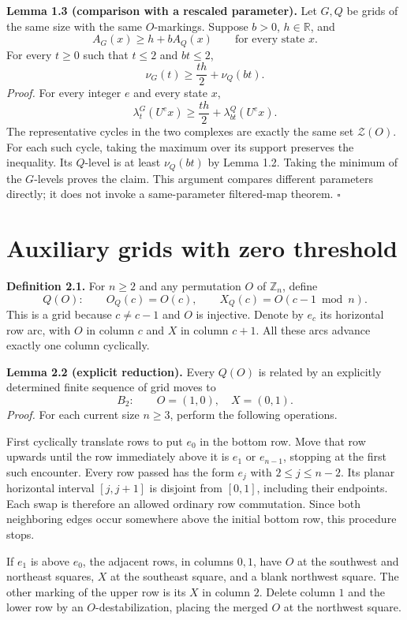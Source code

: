 \documentclass[11pt,a4paper]{article}
\begin{document}
\textbf{Lemma 1.3 (comparison with a rescaled parameter).}
Let $G,Q$ be grids of the same size with the same $O$-markings. Suppose
$b>0$, $h\in\mathbb R$, and
\[
A_G(x)\ge h+bA_Q(x)\qquad\text{for every state }x.
\]
For every $t\ge0$ such that $t\le2$ and $bt\le2$,
\[
\nu_G(t)\ge\frac{th}{2}+\nu_Q(bt).
\]
\textit{Proof.}
For every integer $e$ and every state $x$,
\[
\lambda_t^G(U^e x)\ge\frac{th}{2}+\lambda_{bt}^Q(U^e x).
\]
The representative cycles in the two complexes are exactly the same set
$\mathcal Z(O)$. For each such cycle, taking the maximum over its support
preserves the inequality. Its $Q$-level is at least $\nu_Q(bt)$ by Lemma 1.2.
Taking the minimum of the $G$-levels proves the claim. This argument compares
different parameters directly; it does not invoke a same-parameter
filtered-map theorem. $\square$

\section{Auxiliary grids with zero threshold}

\textbf{Definition 2.1.}
For $n\ge2$ and any permutation $O$ of $\mathbb Z_n$, define
\[
Q(O):\qquad O_Q(c)=O(c),\qquad X_Q(c)=O(c-1\bmod n).
\]
This is a grid because $c\ne c-1$ and $O$ is injective. Denote by $e_c$ its
horizontal row arc, with $O$ in column $c$ and $X$ in column $c+1$.
All these arcs advance exactly one column cyclically.

\textbf{Lemma 2.2 (explicit reduction).}
Every $Q(O)$ is related by an explicitly determined finite sequence of grid
moves to
\[
B_2:\qquad O=(1,0),\quad X=(0,1).
\]
\textit{Proof.}
For each current size $n\ge3$, perform the following operations.

First cyclically translate rows to put $e_0$ in the bottom row. Move that row
upwards until the row immediately above it is $e_1$ or $e_{n-1}$, stopping at
the first such encounter. Every row passed has the form $e_j$ with
$2\le j\le n-2$. Its planar horizontal interval $[j,j+1]$ is disjoint from
$[0,1]$, including their endpoints. Each swap is therefore an allowed
ordinary row commutation. Since both neighboring edges occur somewhere
above the initial bottom row, this procedure stops.

If $e_1$ is above $e_0$, the adjacent rows, in columns $0,1$, have $O$ at the
southwest and northeast squares, $X$ at the southeast square, and a blank
northwest square. The other marking of the upper row is its $X$ in column
$2$. Delete column $1$ and the lower row by an $O$-destabilization, placing
the merged $O$ at the northwest square.
\end{document}

